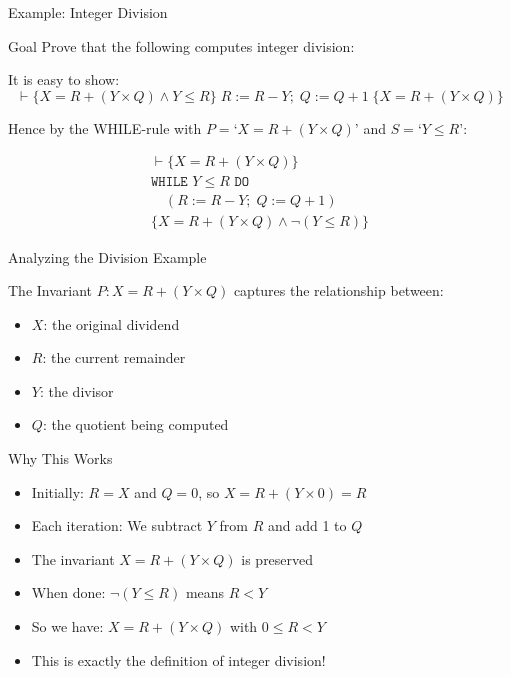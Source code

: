 \begin{frame}{Example: Integer Division}
    \begin{block}{Goal}
        Prove that the following computes integer division:
    \end{block}
    
    \begin{example}
        It is easy to show:
        \[\vdash \{X=R+(Y \times Q) \wedge Y \leq R\} \; R:=R-Y; \; Q:=Q+1 \; \{X=R+(Y \times Q)\}\]
        
        Hence by the WHILE-rule with $P = \text{`}X=R+(Y \times Q)\text{'}$ and $S = \text{`}Y \leq R\text{'}$:
        
        \begin{align*}
        \vdash \{X=R+(Y \times Q)\} \\
        \texttt{WHILE } Y \leq R \texttt{ DO} \\
        \quad (R:=R-Y; \; Q:=Q+1) \\
        \{X=R+(Y \times Q) \wedge \neg(Y \leq R)\}
        \end{align*}
    \end{example}
\end{frame}

\begin{frame}{Analyzing the Division Example}
    \begin{block}{The Invariant}
        $P: X = R + (Y \times Q)$ captures the relationship between:
        \begin{itemize}
            \item $X$: the original dividend
            \item $R$: the current remainder
            \item $Y$: the divisor
            \item $Q$: the quotient being computed
        \end{itemize}
    \end{block}
    
    \begin{block}{Why This Works}
        \begin{itemize}
            \item Initially: $R = X$ and $Q = 0$, so $X = R + (Y \times 0) = R$
            \item Each iteration: We subtract $Y$ from $R$ and add 1 to $Q$
            \item The invariant $X = R + (Y \times Q)$ is preserved
            \item When done: $\neg(Y \leq R)$ means $R < Y$
            \item So we have: $X = R + (Y \times Q)$ with $0 \leq R < Y$
            \item This is exactly the definition of integer division!
        \end{itemize}
    \end{block}
\end{frame}

